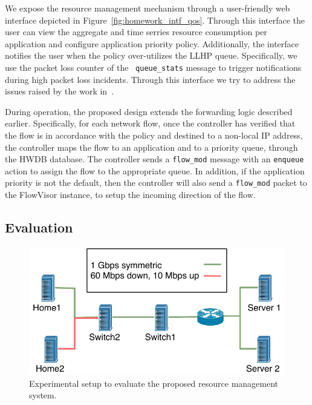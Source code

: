 We expose the resource management mechanism through a user-friendly web
interface depicted in Figure~\ref{fig:homework_intf_qos}.  Through this
interface the user can view the aggregate and time serries resource consumption
per application and configure application priority policy. Additionally, the
interface notifies the user when the policy over-utilizes the LLHP queue.
Specifically, we use the packet loss counter of the \of~{\tt queue\_stats}
message to trigger notifications during high packet loss incidents.  Through
this interface we try to address the issues raised by the work
in~\cite{Chetty10}. 

During operation, the proposed design extends the forwarding logic described
earlier. Specifically, for each network flow, once the controller has verified
that the flow is in accordance with the policy and destined to a non-local IP
address, the controller maps the flow to an application and to a priority queue,
through the HWDB database. The controller sends a {\tt flow\_mod} message with an
{\tt enqueue} action to assign the flow to the appropriate queue. In addition,
if the application priority is not the default, then the controller will also
send a {\tt flow\_mod} packet to the FlowVisor instance, to setup the incoming
direction of the flow. 

\subsection{Evaluation} \label{s:qos:eval}

\begin{figure}
  \centering
  \includegraphics[width=0.8\columnwidth]{queue_eval_setup}
  \caption{\label{fig:queue_eval_setup} Experimental setup to evaluate the
    proposed resource management system.}
\end{figure}

